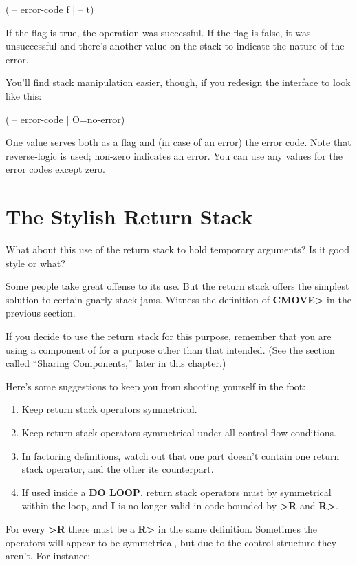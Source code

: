 \begin{Code}
( -- error-code f | -- t)
\end{Code}
If the flag is true, the operation was successful. If the flag is false, it was
unsuccessful and there's another value on the stack to indicate the nature
of the error.

You'll find stack manipulation easier, though, if you redesign the interface
to look like this:

\begin{Code}
( -- error-code | O=no-error)
\end{Code}
One value serves both as a flag and (in case of an error) the error code.
Note that reverse-logic is used; non-zero indicates an error. You can use
any values for the error codes except zero.

\section{The Stylish Return Stack}

What about this use of the return stack to hold temporary arguments? Is
it good style or what?

Some people take great offense to its use. But the return stack
offers the simplest solution to certain gnarly stack jams. Witness the
definition of \textbf{CMOVE>} in the previous section.

If you decide to use the return stack for this purpose, remember
that you are using a component of \Forth{} for a purpose other than that
intended. (See the section called ``Sharing Components,'' later in this
chapter.)

Here's some suggestions to keep you from shooting yourself in the
foot:

\begin{tip}
\begin{enumerate}
\item Keep return stack operators symmetrical.
\item Keep return stack operators symmetrical under all control flow
   conditions.
\item In factoring definitions, watch out that one part doesn't contain one
   return stack operator, and the other its counterpart.
\item If used inside a \textbf{DO LOOP}, return stack operators must by symmetrical
   within the loop, and \textbf{I} is no longer valid in code bounded by
   \textbf{>R} and \textbf{R>}.
\end{enumerate}
\end{tip}
For every \textbf{>R} there must be a \textbf{R>} in the same definition. Sometimes
the operators will appear to be symmetrical, but due to the control structure
they aren't. For instance:

